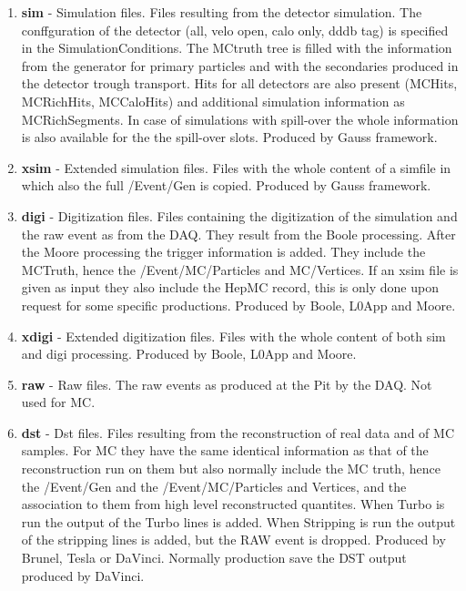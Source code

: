 \documentclass[11pt,a4paper,twoside]{article}
\begin{document}
\begin{enumerate}
\begin{enumerate}
        \item \textbf{sim} - Simulation files. Files resulting from the detector simulation. The conffguration of the detector (all, velo open, calo only, dddb tag) is specified in the SimulationConditions. The MCtruth tree is filled with the information from the generator for primary particles and with the secondaries produced in the detector trough transport. Hits for all detectors are also present (MCHits, MCRichHits, MCCaloHits) and additional simulation information as MCRichSegments. In case of simulations with spill-over the whole information is also available for the the spill-over slots. Produced by Gauss framework.

        \item \textbf{xsim} - Extended simulation files. Files with the whole content of a simfile in which also the full /Event/Gen is copied. Produced by Gauss framework.

        \item \textbf{digi} - Digitization files. Files containing the digitization of the simulation and the raw event as from the DAQ. They result from the Boole processing. After the Moore processing the trigger information is added. They include the MCTruth, hence the /Event/MC/Particles and MC/Vertices. If an xsim file is given as input they also include the HepMC record, this is only done upon request for some specific productions. Produced by Boole, L0App and Moore.

        \item \textbf{xdigi} - Extended digitization files. Files with the whole content of both sim and digi processing. Produced by Boole, L0App and Moore.

        \item \textbf{raw} - Raw files. The raw events as produced at the Pit by the DAQ. Not used for MC.

        \item \textbf{dst} - Dst files. Files resulting from the reconstruction of real data and of MC samples. For MC they have the same identical information as that of the reconstruction run on them but also normally include the MC truth, hence the /Event/Gen and the /Event/MC/Particles and Vertices, and the association to them from high level reconstructed quantites. When Turbo is run the output of the Turbo lines is added. When Stripping is run the output of the stripping lines is added, but the RAW event is dropped. Produced by Brunel, Tesla or DaVinci. Normally production save the DST output produced by DaVinci.


\end{enumerate}
\end{enumerate}
\end{document}
